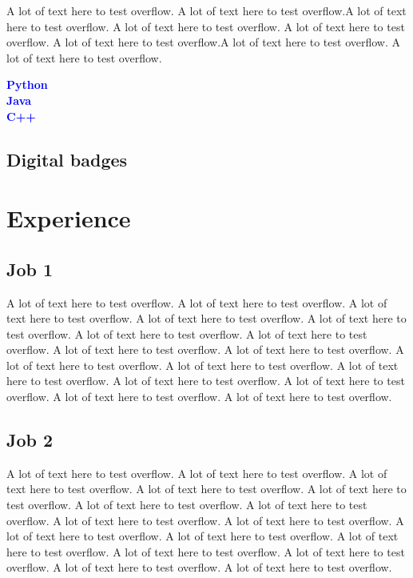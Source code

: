 \documentclass[a4paper,8pt]{article}
\begin{document}
\begin{minipage}[t]{0.34\textwidth}
A lot of text here to test overflow. A lot of text here to test overflow.A lot of text here to test overflow. A lot of text here to test overflow. A lot of text here to test overflow. A lot of text here to test overflow.A lot of text here to test overflow. A lot of text here to test overflow.

\textcolor{blue}{\textbf{Python}}  \\
\textcolor{blue}{\textbf{Java}}  \\
\textcolor{blue}{\textbf{C++}}  \\

\vspace{10.431cm}
{\color{blue}\subsection*{Digital badges}}
\vspace{-3.0mm}
\end{minipage} \hfill %
\begin{minipage}[t]{0.61\textwidth}
{\color{blue}\section*{Experience}}
\vspace{-1.0mm}
\subsection*{Job 1}
\vspace{-1.2mm}
A lot of text here to test overflow. A lot of text here to test overflow. A lot of text here to test overflow. A lot of text here to test overflow. A lot of text here to test overflow. A lot of text here to test overflow. A lot of text here to test overflow. A lot of text here to test overflow.
A lot of text here to test overflow. A lot of text here to test overflow. A lot of text here to test overflow. A lot of text here to test overflow. A lot of text here to test overflow. A lot of text here to test overflow. A lot of text here to test overflow. A lot of text here to test overflow.
\subsection*{Job 2}
\vspace{-1.2mm}
A lot of text here to test overflow. A lot of text here to test overflow. A lot of text here to test overflow. A lot of text here to test overflow. A lot of text here to test overflow. A lot of text here to test overflow. A lot of text here to test overflow. A lot of text here to test overflow.
A lot of text here to test overflow. A lot of text here to test overflow. A lot of text here to test overflow. A lot of text here to test overflow. A lot of text here to test overflow. A lot of text here to test overflow. A lot of text here to test overflow. A lot of text here to test overflow.
\end{minipage} \hfill %
\end{document}
